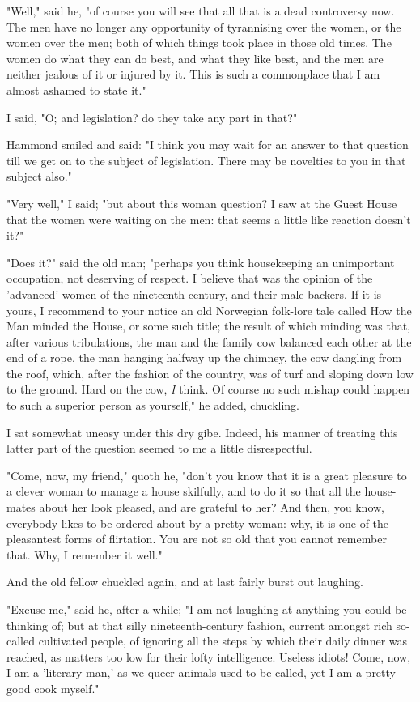 "Well," said he, "of course you will see that all that is a dead
controversy now. The men have no longer any opportunity of tyrannising
over the women, or the women over the men; both of which things took
place in those old times. The women do what they can do best, and what
they like best, and the men are neither jealous of it or injured by it.
This is such a commonplace that I am almost ashamed to state it."

I said, "O; and legislation? do they take any part in that?"

Hammond smiled and said: "I think you may wait for an answer to that
question till we get on to the subject of legislation. There may be
novelties to you in that subject also."

"Very well," I said; "but about this woman question? I saw at the Guest
House that the women were waiting on the men: that seems a little like
reaction doesn't it?"

"Does it?" said the old man; "perhaps you think housekeeping an
unimportant occupation, not deserving of respect. I believe that was the
opinion of the 'advanced' women of the nineteenth century, and their
male backers. If it is yours, I recommend to your notice an old
Norwegian folk-lore tale called How the Man minded the House, or some
such title; the result of which minding was that, after various
tribulations, the man and the family cow balanced each other at the end
of a rope, the man hanging halfway up the chimney, the cow dangling from
the roof, which, after the fashion of the country, was of turf and
sloping down low to the ground. Hard on the cow, \emph{I} think. Of
course no such mishap could happen to such a superior person as
yourself," he added, chuckling.

I sat somewhat uneasy under this dry gibe. Indeed, his manner of
treating this latter part of the question seemed to me a little
disrespectful.

"Come, now, my friend," quoth he, "don't you know that it is a great
pleasure to a clever woman to manage a house skilfully, and to do it so
that all the house-mates about her look pleased, and are grateful to
her? And then, you know, everybody likes to be ordered about by a pretty
woman: why, it is one of the pleasantest forms of flirtation. You are
not so old that you cannot remember that. Why, I remember it well."

And the old fellow chuckled again, and at last fairly burst out
laughing.

"Excuse me," said he, after a while; "I am not laughing at anything you
could be thinking of; but at that silly nineteenth-century fashion,
current amongst rich so-called cultivated people, of ignoring all the
steps by which their daily dinner was reached, as matters too low for
their lofty intelligence. Useless idiots! Come, now, I am a 'literary
man,' as we queer animals used to be called, yet I am a pretty good cook
myself."

